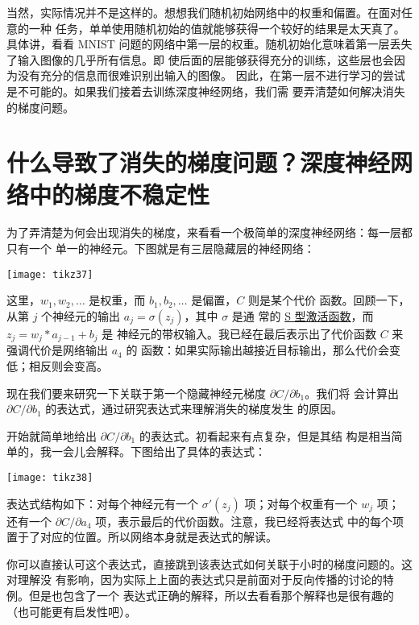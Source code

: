 当然，实际情况并不是这样的。想想我们随机初始网络中的权重和偏置。在面对任意的一种
任务，单单使用随机初始的值就能够获得一个较好的结果是太天真了。具体讲，看看 MNIST
问题的网络中第一层的权重。随机初始化意味着第一层丢失了输入图像的几乎所有信息。即
使后面的层能够获得充分的训练，这些层也会因为没有充分的信息而很难识别出输入的图像。
因此，在第一层不进行学习的尝试是不可能的。如果我们接着去训练深度神经网络，我们需
要弄清楚如何解决消失的梯度问题。

\section{什么导致了消失的梯度问题？深度神经网络中的梯度不稳定性}
\label{sec:what_is_causing_the_vanishing_gradient_problem_unstable_gradients_in_deep_neural_nets}

为了弄清楚为何会出现消失的梯度，来看看一个极简单的深度神经网络：每一层都只有一个
单一的神经元。下图就是有三层隐藏层的神经网络：
\begin{center}
  \texttt{[image: tikz37]}
\end{center}

这里，$w_1, w_2, \ldots$ 是权重，而 $b_1, b_2, \ldots$ 是偏置，$C$ 则是某个代价
函数。回顾一下，从第 $j$ 个神经元的输出 $a_j = \sigma(z_j)$，其中 $\sigma$ 是通
常的 \hyperref[sigmoid_neurons]{S 型激活函数}，而 $z_j = w_j * a_{j-1} + b_j$ 是
神经元的带权输入。我已经在最后表示出了代价函数 $C$ 来强调代价是网络输出 $a_4$ 的
函数：如果实际输出越接近目标输出，那么代价会变低；相反则会变高。
 
现在我们要来研究一下关联于第一个隐藏神经元梯度 $\partial C/\partial b_1$。我们将
会计算出 $\partial C/\partial b_1$ 的表达式，通过研究表达式来理解消失的梯度发生
的原因。
 
开始就简单地给出 $\partial C/\partial b_1$ 的表达式。初看起来有点复杂，但是其结
构是相当简单的，我一会儿会解释。下图给出了具体的表达式：
\begin{center}
  \texttt{[image: tikz38]}
\end{center}

表达式结构如下：对每个神经元有一个 $\sigma'(z_j)$ 项；对每个权重有一个 $w_j$ 项；
还有一个 $\partial C/\partial a_4$ 项，表示最后的代价函数。注意，我已经将表达式
中的每个项置于了对应的位置。所以网络本身就是表达式的解读。
 
你可以直接认可这个表达式，直接跳到该表达式如何关联于小时的梯度问题的。这对理解没
有影响，因为实际上上面的表达式只是前面对于反向传播的讨论的特例。但是也包含了一个
表达式正确的解释，所以去看看那个解释也是很有趣的（也可能更有启发性吧）。
 
